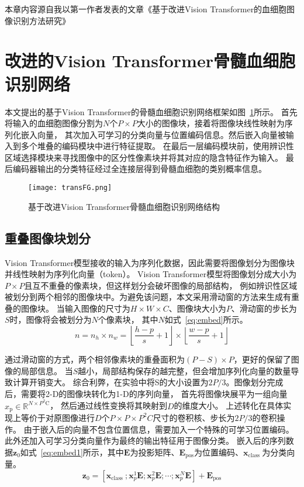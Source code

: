 本章内容源自我以第一作者发表的文章《基于改进Vision Transformer的血细胞图像识别方法研究》\cite{SWGC202206005}

\section{改进的Vision Transformer骨髓血细胞识别网络}

本文提出的基于Vision Transformer的骨髓血细胞识别网络框架如图~\ref{fig:vit}所示。
首先将输入的血细胞图像分割为$N$个$P \times P$大小的图像块，接着将图像块线性映射为序列化嵌入向量，
其次加入可学习的分类向量与位置编码信息。然后嵌入向量被输入到多个堆叠的编码模块中进行特征提取。
在最后一层编码模块前，使用辨识性区域选择模块来寻找图像中的区分性像素块并将其对应的隐含特征作为输入。
最后编码器输出的分类特征经过全连接层得到骨髓血细胞的类别概率信息。

\begin{figure}[htbp] 
   \centering   
   \texttt{[image: transFG.png]}   
   \caption{基于改进Vision Transformer骨髓血细胞识别网络结构}   
   \label{fig:vit} 
\end{figure}  

\subsection{重叠图像块划分}
Vision Transformer模型接收的输入为序列化数据，因此需要将图像划分为图像块并线性映射为序列化向量（token）。
Vision Transformer模型将图像划分成大小为$P \times P$且互不重叠的像素块，但这样划分会破坏图像的局部结构，
例如辨识性区域被划分到两个相邻的图像块中。为避免该问题，本文采用滑动窗的方法来生成有重叠的图像块。
当输入图像的尺寸为$H \times W \times C$、图像块大小为$P$、滑动窗的步长为$S$时，图像将会被划分为$N$个像素块，
其中$N$如式~\ref{eq:embed}所示。
\begin{equation}
  n=n_{h} \times n_{w}=\left\lfloor\frac{h-p}{s}+1\right\rfloor \times\left\lfloor\frac{w-p}{s}+1\right\rfloor
  \label{eq:embed}
\end{equation}

通过滑动窗的方式，两个相邻像素块的重叠面积为$(P-S) \times P$，更好的保留了图像的局部信息。
当$S$越小，局部结构保存的越完整，但会增加序列化向量的数量导致计算开销变大。
综合利弊，在实验中将S的大小设置为$2P/3$。图像划分完成后，需要将2-D的图像块转化为1-D的序列向量，
首先将图像块展平为一组向量$x_{\mathrm{p}} \in \mathbb{R}^{N \times P^{2} \mathrm{C}}$，
然后通过线性变换将其映射到$D$的维度大小。
上述转化在具体实现上等价于对原图像进行$D$个$P \times P \times P^2C$尺寸的卷积核、步长为$2P/3$的卷积操作。
由于嵌入后的向量不包含位置信息，需要加入一个特殊的可学习位置编码。
此外还加入可学习分类向量作为最终的输出特征用于图像分类。
嵌入后的序列数据$\mathbf{z}_{0}$如式~\ref{eq:embed1}所示，其中$\boldsymbol{E}$为投影矩阵、$\boldsymbol{E}_{\mathrm{pos}}$为位置编码、$\boldsymbol{x}_{\text {class }}$为分类向量。
\begin{equation}
    \mathbf{z}_{0}=\left[\boldsymbol{x}_{\text {class }} ; \boldsymbol{x}_{p}^{1} \boldsymbol{E} ; \boldsymbol{x}_{p}^{2} \boldsymbol{E} ; \cdots ; \boldsymbol{x}_{p}^{N} \boldsymbol{E}\right]+\boldsymbol{E}_{\mathrm{pos}}
    \label{eq:embed1}
\end{equation}


